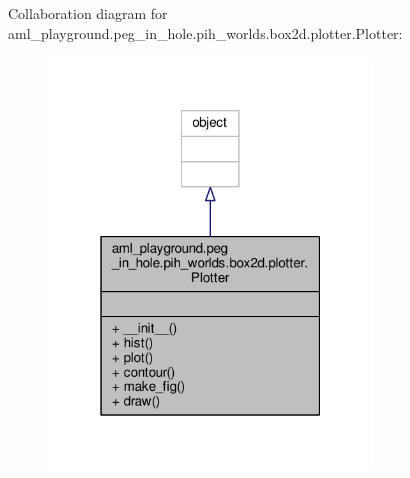 Collaboration diagram for aml\-\_\-playground.\-peg\-\_\-in\-\_\-hole.\-pih\-\_\-worlds.\-box2d.\-plotter.\-Plotter\-:\nopagebreak
\begin{figure}[H]
\begin{center}
\leavevmode
\includegraphics[width=244pt]{classaml__playground_1_1peg__in__hole_1_1pih__worlds_1_1box2d_1_1plotter_1_1_plotter__coll__graph}
\end{center}
\end{figure}

